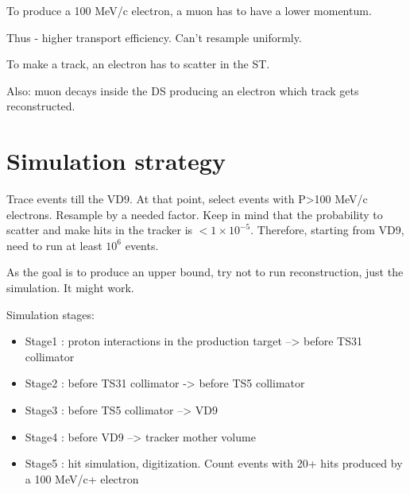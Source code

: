 \documentclass[12pt]{article}
\begin{document}
To produce a 100 MeV/c electron, a muon has to have a lower momentum.

Thus - higher transport efficiency. Can't resample uniformly.

To make a track, an electron has to scatter in the ST.

Also: muon decays inside the DS producing an electron which track gets reconstructed.

\section {Simulation strategy}

Trace events till the VD9. At that point, select events with P>100 MeV/c electrons.
Resample by a needed factor.
Keep in mind that the probability to scatter and make hits in the tracker is $< 1 \times 10^{-5}$.
Therefore, starting from VD9, need to run at least $10^6$ events.

As the goal is to produce an upper bound, try not to run reconstruction, just the simulation.
It might work.

Simulation stages:

\begin{itemize}
\item
  Stage1 : proton interactions in the production target --> before TS31 collimator 
\item
  Stage2 : before TS31 collimator -> before TS5 collimator
\item
  Stage3 : before TS5 collimator --> VD9
\item
  Stage4 : before VD9 --> tracker mother volume
\item
  Stage5 : hit simulation, digitization. Count events with 20+ hits produced by a 100 MeV/c+ electron
\end{itemize}
\end{document}

